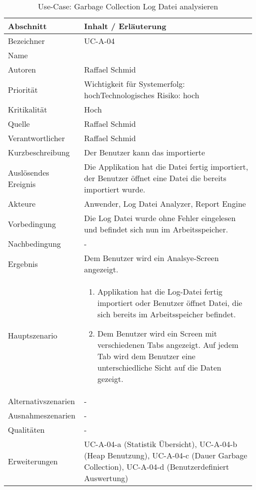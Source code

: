 \begin{longtable}{|p{4cm}|p{10.5cm}|}
\caption{Use-Case: Garbage Collection Log Datei analysieren}\\\hline
   \textbf{Abschnitt} & \textbf{Inhalt / Erläuterung} \\\hline
   Bezeichner & UC-A-04\\\hline
   Name & \\\hline
   Autoren & Raffael Schmid\\\hline
   Priorität & Wichtigkeit für Systemerfolg: hoch\newline Technologisches Risiko: hoch\\\hline
   Kritikalität & Hoch\\\hline
   Quelle & Raffael Schmid\\\hline
   Verantwortlicher & Raffael Schmid\\\hline
   Kurzbeschreibung & Der Benutzer kann das importierte \\\hline
   Auslösendes Ereignis & Die Applikation hat die Datei fertig importiert, der Benutzer öffnet eine Datei die bereits importiert wurde.\\\hline
   Akteure & Anwender, Log Datei Analyzer, Report Engine\\\hline
   Vorbedingung & Die Log Datei wurde ohne Fehler eingelesen und befindet sich nun im Arbeitsspeicher.\\\hline
   Nachbedingung & -\\\hline
   Ergebnis & Dem Benutzer wird ein Analsye-Screen angezeigt.\\\hline
   Hauptszenario & 
	\begin{enumerate}
		\item Applikation hat die Log-Datei fertig importiert oder Benutzer öffnet Datei, die sich bereits im Arbeitsspeicher befindet.
		\item Dem Benutzer wird ein Screen mit verschiedenen Tabs angezeigt. Auf jedem Tab wird dem Benutzer eine unterschiedliche Sicht auf die Daten gezeigt.
	\end{enumerate}
	\\\hline
   Alternativszenarien & -\\\hline
   Ausnahmeszenarien & -\\\hline
   Qualitäten & -\\\hline
   Erweiterungen & UC-A-04-a (Statistik Übersicht), UC-A-04-b (Heap Benutzung), UC-A-04-c (Dauer Garbage Collection), UC-A-04-d (Benutzerdefiniert Auswertung) \\\hline
\end{longtable}

